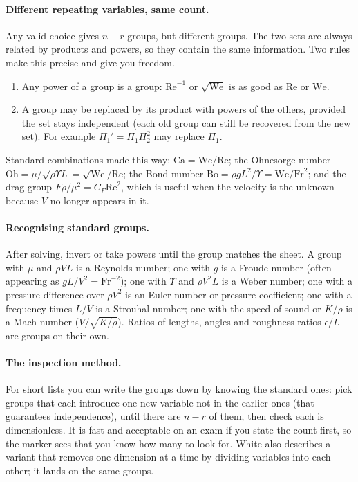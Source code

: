 \paragraph{Different repeating variables, same count.} Any valid choice gives $n - r$ groups, but different groups. The two sets are always related by products and powers, so they contain the same information. Two rules make this precise and give you freedom.
\begin{enumerate}[nosep,leftmargin=*]
\item Any power of a group is a group: $\mathrm{Re}^{-1}$ or $\sqrt{\mathrm{We}}$ is as good as $\mathrm{Re}$ or $\mathrm{We}$.
\item A group may be replaced by its product with powers of the others, provided the set stays independent (each old group can still be recovered from the new set). For example $\Pi_1' = \Pi_1 \Pi_2^2$ may replace $\Pi_1$.
\end{enumerate}
Standard combinations made this way: $\mathrm{Ca} = \mathrm{We}/\mathrm{Re}$; the Ohnesorge number $\mathrm{Oh} = \mu/\sqrt{\rho \Upsilon L} = \sqrt{\mathrm{We}}/\mathrm{Re}$; the Bond number $\mathrm{Bo} = \rho g L^2/\Upsilon = \mathrm{We}/\mathrm{Fr}^2$; and the drag group $F\rho/\mu^2 = C_F \mathrm{Re}^2$, which is useful when the velocity is the unknown because $V$ no longer appears in it.

\paragraph{Recognising standard groups.} After solving, invert or take powers until the group matches the sheet. A group with $\mu$ and $\rho V L$ is a Reynolds number; one with $g$ is a Froude number (often appearing as $gL/V^2 = \mathrm{Fr}^{-2}$); one with $\Upsilon$ and $\rho V^2L$ is a Weber number; one with a pressure difference over $\rho V^2$ is an Euler number or pressure coefficient; one with a frequency times $L/V$ is a Strouhal number; one with the speed of sound or $K/\rho$ is a Mach number ($V/\sqrt{K/\rho}$). Ratios of lengths, angles and roughness ratios $\epsilon/L$ are groups on their own.

\paragraph{The inspection method.} For short lists you can write the groups down by knowing the standard ones: pick groups that each introduce one new variable not in the earlier ones (that guarantees independence), until there are $n - r$ of them, then check each is dimensionless. It is fast and acceptable on an exam if you state the count first, so the marker sees that you know how many to look for. White also describes a variant that removes one dimension at a time by dividing variables into each other; it lands on the same groups.

